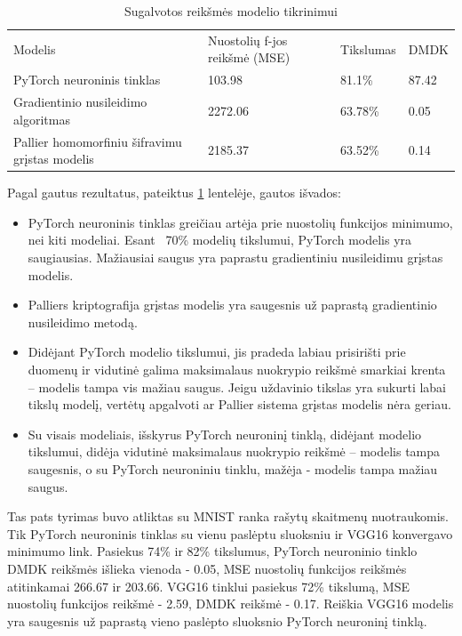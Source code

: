 \documentclass{VUMIFInfBakalaurinis}
\begin{document}
\begin{table}[h]
\begin{adjustbox}{width=\textwidth,center=\textwidth}
\begin{tabular}{|l|l|l|l|}
\cline{1-4}
Modelis & Nuostolių f-jos reikšmė (MSE) & Tikslumas & DMDK  \\\cline{1-4}
PyTorch neuroninis tinklas & 103.98 & 81.1\% & 87.42  \\\cline{1-4}
Gradientinio nusileidimo algoritmas & 2272.06 & 63.78\% & 0.05 \\\cline{1-4}
Pallier homomorfiniu šifravimu grįstas modelis & 2185.37 & 63.52\% & 0.14 \\\cline{1-4}
\end{tabular}
\end{adjustbox}
\caption{Sugalvotos reikšmės modelio tikrinimui}
\label{tab:DMDK rezultatai}
\end{table}

\par Pagal gautus rezultatus, pateiktus \ref{tab:DMDK rezultatai} lentelėje, gautos išvados:
\begin{itemize}
    \item PyTorch neuroninis tinklas greičiau artėja prie nuostolių funkcijos minimumo, nei kiti modeliai. Esant ~70\% modelių tikslumui, PyTorch modelis yra saugiausias. Mažiausiai saugus yra paprastu gradientiniu nusileidimu grįstas modelis. 
    \item Palliers kriptografija grįstas modelis yra saugesnis už paprastą gradientinio nusileidimo metodą.
    \item Didėjant PyTorch modelio tikslumui, jis pradeda labiau prisirišti prie duomenų ir vidutinė galima maksimalaus nuokrypio reikšmė smarkiai krenta – modelis tampa vis mažiau saugus. Jeigu uždavinio tikslas yra sukurti labai tikslų modelį, vertėtų apgalvoti ar Pallier sistema grįstas modelis nėra geriau.
    \item Su visais modeliais, išskyrus PyTorch neuroninį tinklą, didėjant modelio tikslumui, didėja vidutinė maksimalaus nuokrypio reikšmė – modelis tampa saugesnis, o su PyTorch neuroniniu tinklu, mažėja - modelis tampa mažiau saugus. 
\end{itemize}

\par Tas pats tyrimas buvo atliktas su MNIST ranka rašytų skaitmenų nuotraukomis. Tik PyTorch neuroninis tinklas su vienu paslėptu sluoksniu ir VGG16 konvergavo minimumo link. Pasiekus 74\% ir 82\% tikslumus, PyTorch neuroninio tinklo DMDK reikšmės išlieka vienoda - 0.05, MSE nuostolių funkcijos reikšmės atitinkamai 266.67 ir 203.66. VGG16 tinklui pasiekus 72\% tikslumą, MSE nuostolių funkcijos reikšmė - 2.59, DMDK reikšmė -  0.17. Reiškia VGG16 modelis yra saugesnis už paprastą vieno paslėpto sluoksnio PyTorch neuroninį tinklą.
\end{document}
